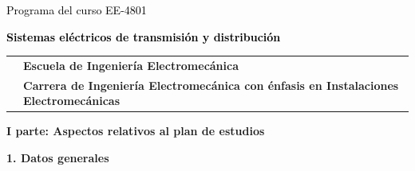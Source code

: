 \documentclass[letterpaper]{article}%
\begin{document}
%
\normalsize%
\thispagestyle{empty}%
%
\vspace*{100mm}%
\par\fontsize{14}{0}\selectfont \textcolor{black}{Programa del curso EE{-}4801}%
\par\fontsize{18}{25}\selectfont \textbf{\textcolor{black}{Sistemas eléctricos de transmisión y distribución}}%
\vspace*{15mm}%
\newline%
\begin{tabularx}{\textwidth}{m{}m{}}%
&\hspace*{0mm}\fontsize{12}{0}\selectfont \textbf{\textcolor{gris}{Escuela de Ingeniería Electromecánica}}\\%
[-12pt]%
&\hspace*{0mm}\fontsize{12}{0}\selectfont \textbf{\textcolor{gris}{Carrera de Ingeniería Electromecánica con énfasis en Instalaciones Electromecánicas}}\\%
\end{tabularx}%
\newpage%
\pagestyle{headfoot}%
\par\fontsize{14}{0}\selectfont \textbf{\textcolor{parte}{I parte: Aspectos relativos al plan de estudios}}%
\par\hspace*{2mm}\fontsize{12}{14}\selectfont \textbf{\textcolor{parte}{1. Datos generales}}%
\vspace*{3mm}%
\newline%
\fontsize{10}{12}\selectfont %
\end{document}
